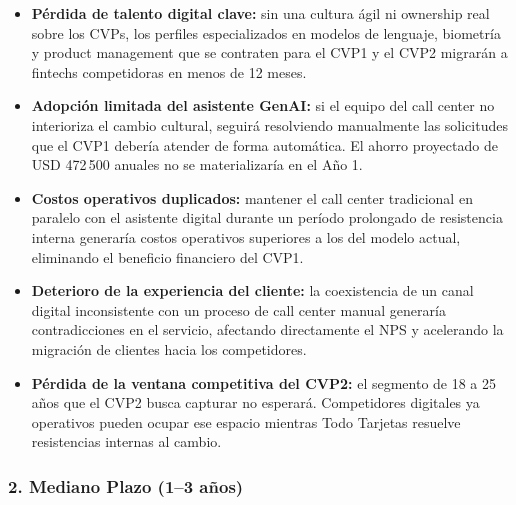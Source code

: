 \documentclass[12pt,letterpaper]{article}
\begin{document}
\begin{itemize}
  \item \textbf{Pérdida de talento digital clave:} sin una cultura ágil ni ownership real sobre
    los CVPs, los perfiles especializados en modelos de lenguaje, biometría y product
    management que se contraten para el CVP1 y el CVP2 migrarán a fintechs competidoras en
    menos de 12 meses.
  \item \textbf{Adopción limitada del asistente GenAI:} si el equipo del call center no
    interioriza el cambio cultural, seguirá resolviendo manualmente las solicitudes que el CVP1
    debería atender de forma automática. El ahorro proyectado de USD 472\,500 anuales no se
    materializaría en el Año 1.
  \item \textbf{Costos operativos duplicados:} mantener el call center tradicional en paralelo
    con el asistente digital durante un período prolongado de resistencia interna generaría
    costos operativos superiores a los del modelo actual, eliminando el beneficio financiero
    del CVP1.
  \item \textbf{Deterioro de la experiencia del cliente:} la coexistencia de un canal digital
    inconsistente con un proceso de call center manual generaría contradicciones en el
    servicio, afectando directamente el NPS y acelerando la migración de clientes hacia los
    competidores.
  \item \textbf{Pérdida de la ventana competitiva del CVP2:} el segmento de 18 a 25 años que
    el CVP2 busca capturar no esperará. Competidores digitales ya operativos pueden ocupar ese
    espacio mientras Todo Tarjetas resuelve resistencias internas al cambio.
\end{itemize}

\subsubsection*{2. Mediano Plazo (1–3 años)}
\end{document}
